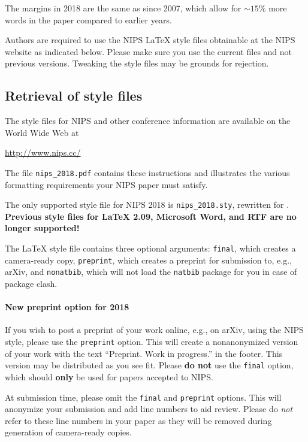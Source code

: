 \documentclass{article}
\begin{document}
The margins in 2018 are the same as since 2007, which allow for
$\sim$$15\%$ more words in the paper compared to earlier years.

Authors are required to use the NIPS \LaTeX{} style files obtainable
at the NIPS website as indicated below. Please make sure you use the
current files and not previous versions. Tweaking the style files may
be grounds for rejection.

\subsection{Retrieval of style files}

The style files for NIPS and other conference information are
available on the World Wide Web at
\begin{center}
  \url{http://www.nips.cc/}
\end{center}
The file \verb+nips_2018.pdf+ contains these instructions and
illustrates the various formatting requirements your NIPS paper must
satisfy.

The only supported style file for NIPS 2018 is \verb+nips_2018.sty+,
rewritten for \LaTeXe{}.  \textbf{Previous style files for \LaTeX{}
  2.09, Microsoft Word, and RTF are no longer supported!}

The \LaTeX{} style file contains three optional arguments: \verb+final+,
which creates a camera-ready copy, \verb+preprint+, which creates a
preprint for submission to, e.g., arXiv, and \verb+nonatbib+, which will
not load the \verb+natbib+ package for you in case of package clash.

\paragraph{New preprint option for 2018}
If you wish to post a preprint of your work online, e.g., on arXiv,
using the NIPS style, please use the \verb+preprint+ option. This will
create a nonanonymized version of your work with the text
``Preprint. Work in progress.''  in the footer. This version may be
distributed as you see fit. Please \textbf{do not} use the
\verb+final+ option, which should \textbf{only} be used for papers
accepted to NIPS.

At submission time, please omit the \verb+final+ and \verb+preprint+
options. This will anonymize your submission and add line numbers to aid
review. Please do \emph{not} refer to these line numbers in your paper
as they will be removed during generation of camera-ready copies.
\end{document}
